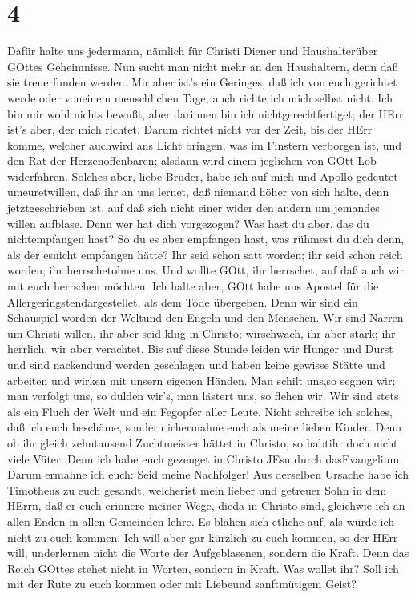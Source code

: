 \hypertarget{section-3}{%
\section{4}\label{section-3}}

 Dafür halte uns jedermann, nämlich für Christi Diener und
Haushalterüber GOttes Geheimnisse.  Nun sucht man nicht mehr
an den Haushaltern, denn daß sie treuerfunden werden.  Mir
aber ist's ein Geringes, daß ich von euch gerichtet werde oder voneinem
menschlichen Tage; auch richte ich mich selbst nicht.  Ich
bin mir wohl nichts bewußt, aber darinnen bin ich nichtgerechtfertiget;
der HErr ist's aber, der mich richtet.  Darum richtet nicht
vor der Zeit, bis der HErr komme, welcher auchwird ans Licht bringen,
was im Finstern verborgen ist, und den Rat der Herzenoffenbaren; alsdann
wird einem jeglichen von GOtt Lob widerfahren.  Solches
aber, liebe Brüder, habe ich auf mich und Apollo gedeutet umeuretwillen,
daß ihr an uns lernet, daß niemand höher von sich halte, denn
jetztgeschrieben ist, auf daß sich nicht einer wider den andern um
jemandes willen aufblase.  Denn wer hat dich vorgezogen? Was
hast du aber, das du nichtempfangen hast? So du es aber empfangen hast,
was rühmest du dich denn, als der esnicht empfangen hätte? 
Ihr seid schon satt worden; ihr seid schon reich worden; ihr
herrschetohne uns. Und wollte GOtt, ihr herrschet, auf daß auch wir mit
euch herrschen möchten.  Ich halte aber, GOtt habe uns
Apostel für die Allergeringstendargestellet, als dem Tode übergeben.
Denn wir sind ein Schauspiel worden der Weltund den Engeln und den
Menschen.  Wir sind Narren um Christi willen, ihr aber seid
klug in Christo; wirschwach, ihr aber stark; ihr herrlich, wir aber
verachtet.  Bis auf diese Stunde leiden wir Hunger und
Durst und sind nackendund werden geschlagen und haben keine gewisse
Stätte  und arbeiten und wirken mit unsern eigenen Händen.
Man schilt uns,so segnen wir; man verfolgt uns, so dulden wir's, man
lästert uns, so flehen wir.  Wir sind stets als ein Fluch
der Welt und ein Fegopfer aller Leute.  Nicht schreibe ich
solches, daß ich euch beschäme, sondern ichermahne euch als meine lieben
Kinder.  Denn ob ihr gleich zehntausend Zuchtmeister hättet
in Christo, so habtihr doch nicht viele Väter. Denn ich habe euch
gezeuget in Christo JEsu durch dasEvangelium.  Darum
ermahne ich euch: Seid meine Nachfolger!  Aus derselben
Ursache habe ich Timotheus zu euch gesandt, welcherist mein lieber und
getreuer Sohn in dem HErrn, daß er euch erinnere meiner Wege, dieda in
Christo sind, gleichwie ich an allen Enden in allen Gemeinden lehre.
 Es blähen sich etliche auf, als würde ich nicht zu euch
kommen.  Ich will aber gar kürzlich zu euch kommen, so der
HErr will, underlernen nicht die Worte der Aufgeblasenen, sondern die
Kraft.  Denn das Reich GOttes stehet nicht in Worten,
sondern in Kraft.  Was wollet ihr? Soll ich mit der Rute zu
euch kommen oder mit Liebeund sanftmütigem Geist?

